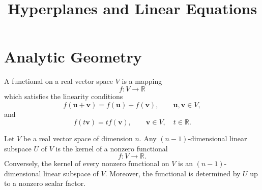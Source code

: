 \documentclass[12pt]{article}
\title{Hyperplanes and Linear Equations}
\author{}
\date{}
\begin{document}
\maketitle

\section{Analytic Geometry}

A functional on a real vector space \(V\) is a mapping
\[
f:V\longrightarrow\mathbb{R}
\]
which satisfies the linearity conditions
\[
f(\mathbf{u}+\mathbf{v})
=
f(\mathbf{u})+f(\mathbf{v}),
\qquad
\mathbf{u},\mathbf{v}\in V,
\]
and
\[
f(t\mathbf{v})
=
t f(\mathbf{v}),
\qquad
\mathbf{v}\in V,\quad t\in\mathbb{R}.
\]

\begin{proposition}
Let \(V\) be a real vector space of dimension \(n\). Any
\((n-1)\)-dimensional linear subspace \(U\) of \(V\) is the kernel of a
nonzero functional
\[
f:V\longrightarrow\mathbb{R}.
\]
Conversely, the kernel of every nonzero functional on \(V\) is an
\((n-1)\)-dimensional linear subspace of \(V\). Moreover, the functional
is determined by \(U\) up to a nonzero scalar factor.
\end{proposition}
\end{document}
